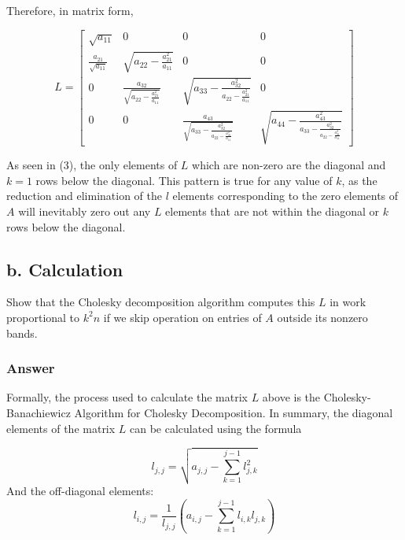 \documentclass{article}
\begin{document}
		Therefore, in matrix form, 
		
		\begin{equation}
			L=
			\begin{bmatrix}
			\sqrt{a_{11}} & 0 & 0 & 0 \\
			\frac{a_{21}}{\sqrt{a_{11}}} & \sqrt{a_{22}-\frac{a_{21}^{2}}{a_{11}}} & 0 & 0 \\
			0 & \frac{a_{32}}{\sqrt{a_{22}-\frac{a_{21}^{2}}{a_{11}}}} & \sqrt{a_{33}-\frac{a_{32}^{2}}{a_{22}-\frac{a_{21}^{2}}{a_{11}}}} & 0 \\
			0 & 0 & \frac{a_{43}}{\sqrt{a_{33}-\frac{a_{32}^{2}}{a_{22}-\frac{a_{21}^{2}}{a_{11}}}}} & \sqrt{a_{44}-\frac{a_{43}^2}{a_{33}-\frac{a_{32}^{2}}{a_{22}-\frac{a_{21}^{2}}{a_{11}}}}}
			\end{bmatrix}
		\end{equation}
		
		As seen in (3), the only elements of $L$ which are non-zero are the diagonal and $k=1$ rows below the diagonal.  This pattern is true for any value of $k$, as the reduction and elimination of the $l$ elements corresponding to the zero elements of $A$ will inevitably zero out any $L$ elements that are not within the diagonal or $k$ rows below the diagonal.
		
		\subsection{b. Calculation}
		Show that the Cholesky decomposition algorithm computes this $L$ in work proportional to $k^{2}n$ if we skip operation on entries of $A$ outside its nonzero bands.
		
		\subsubsection{Answer}
		
		Formally, the process used to calculate the matrix $L$ above is the Cholesky-Banachiewicz Algorithm for Cholesky Decomposition\cite{CD}.  In summary, the diagonal elements of the matrix $L$ can be calculated using the formula
		
		\begin{equation}
			l_{j,j}=\sqrt{a_{j,j}-\sum_{k=1}^{j-1}l_{j,k}^2}
		\end{equation}
		And the off-diagonal elements:
		\begin{equation}
			l_{i,j}=\frac{1}{l_{j,j}}(a_{i,j}-\sum_{k=1}^{j-1}l_{i,k}l_{j,k})
		\end{equation}
		
\end{document}
